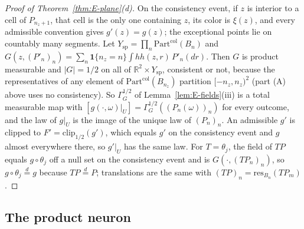 \documentclass[11pt]{article}
\theoremstyle{plain}
\theoremstyle{definition}
\theoremstyle{remark}
\newcommand{\R}{\mathbb{R}}
\newcommand{\ind}{\mathbf{1}}
\newcommand{\Part}{\mathrm{Part}}
\newcommand{\resB}{\mathrm{res}}
\newcommand{\clip}{\mathrm{clip}}
\begin{document}
\begin{proof}[Proof of Theorem~\ref{thm:E-plane}(d)]
On the consistency event, if $z$ is interior to a cell of $P_{n_z+1}$, that cell is the
only one containing $z$, its color is $\xi(z)$, and every admissible convention gives
$g'(z)=g(z)$; the exceptional points lie on countably many segments. Let
$Y_{\mathrm{sp}}=\prod_n\Part^{\mathrm{col}}(B_n)$ and $G(z,(P'_n)_n)=\sum_n\ind\{n_z=n\}\int hh(z,r)\,P'_n(dr)$. Then $G$ is
product measurable and $|G|=1/2$ on all of $\R^{2}\times Y_{\mathrm{sp}}$, consistent or not, because
the representatives of any element of $\Part^{\mathrm{col}}(B_{n_z})$ partition $[-n_z,n_z)^{2}$ (part
(A) above uses no consistency). So $\Gamma^{1/2}_{G}$ of Lemma~\ref{lem:E-fields}(iii) is a total
measurable map with $[g(\cdot,\omega)|_U]=\Gamma^{1/2}_{G}((P_n(\omega))_n)$ for every outcome, and the law of
$g|_U$ is the image of the unique law of $(P_n)_n$. An admissible $g'$ is clipped to
$F'=\clip_{1/2}(g')$, which equals $g'$ on the consistency event and $g$ almost everywhere
there, so $g'|_U$ has the same law. For $T=\theta_j$, the field of $TP$ equals $g\circ\theta_j$ off
a null set on the consistency event and is $G(\cdot,(TP_n)_n)$, so
$g\circ\theta_j\overset{d}{=}g$ because $TP\overset{d}{=}P$; translations are the same with
$(TP)_n=\resB_{B_n}(TP_m)$.
\end{proof}

\subsection{The product neuron}
\end{document}
